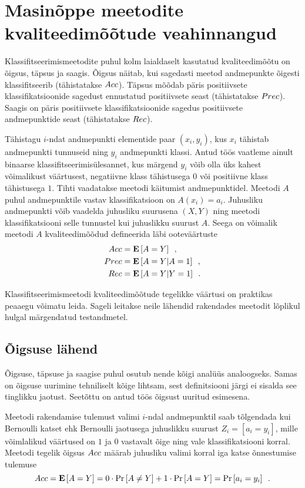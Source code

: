 \section{Masinõppe meetodite kvaliteedimõõtude veahinnangud}
\label{section:kvaliteedimõõtude veahinnangud}
Klassifitseerimismeetodite puhul kolm laialdaselt kasutatud kvaliteedimõõtu on õigsus, täpsus ja saagis. Õigsus näitab, kui sagedasti meetod andmepunkte õigesti klassifitseerib (tähistatakse $Acc$). Täpsus mõõdab päris positiivsete klassifikatsioonide sagedust ennustatud positiivsete seast (tähistatakse $Prec$). Saagis on päris positiivsete klassifikatsioonide sagedus positiivsete andmepunktide seast (tähistatakse $Rec$).

Tähistagu $i$-ndat andmepunkti elementide paar $(x_i, y_i)$, kus $x_i$ tähistab andmepunkti tunnuseid ning $y_i$ andmepunkti klassi. Antud töös vaatleme ainult binaarse klassifitseerimisülesannet, kus märgend $y_i$ võib olla üks kahest võimalikust väärtusest, negatiivne klass tähistusega $0$ või positiivne klass tähistusega $1$. Tihti vaadatakse meetodi käitumist andmepunktidel. Meetodi $A$ puhul andmepunktile vastav klassifikatsioon on $A(x_i)=a_i$. Juhusliku andmepunkti võib vaadelda juhusliku suurusena $(X, Y)$ ning meetodi klassifikatsiooni selle tunnustel  kui juhuslikku suurust $A$. Seega on võimalik meetodi $A$ kvaliteedimõõdud defineerida läbi ooteväärtuste
\begin{align}
    Acc&=\operatorname*{\mathbf{E}}\left[A=Y\right] \enspace, \label{eq:õigsus}\\
    Prec&=\operatorname*{\mathbf{E}}\left[A=Y|A=1\right] \enspace, \label{eq:täpsus}\\
    Rec&=\operatorname*{\mathbf{E}}\left[A=Y|Y=1\right] \enspace. \label{eq:saagis}
\end{align}

Klassifitseerimismeetodi kvaliteedimõõtude tegelikke väärtusi on praktikas peaaegu võimatu leida. Sageli leitakse neile lähendid rakendades meetodit lõplikul hulgal märgendatud testandmetel.

\subsection{Õigsuse lähend}
Õigsuse, täpsuse ja saagise puhul osutub nende kõigi analüüs analoogseks. Samas on õigsuse uurimine tehniliselt kõige lihtsam, sest definitsiooni järgi ei sisalda see tinglikku jaotust. Seetõttu on antud töös õigsust uuritud esimesena.
 
Meetodi rakendamise tulemust valimi $i$-ndal andmepunktil saab tõlgendada kui Bernoulli katset ehk Bernoulli jaotusega juhuslikku suurust $Z_i=[a_i=y_i]$, mille võimlalikud väärtused on $1$ ja $0$ vastavalt õige ning vale klassifikatsiooni korral. Meetodi tegelik õigsus $Acc$ määrab juhusliku valimi korral iga katse õnnestumise tulemuse
\begin{equation*}
    Acc=\operatorname*{\mathbf{E}}\left[A=Y\right]=0\cdot\Pr\left[A\neq Y\right]+1\cdot\Pr\left[A=Y\right]=\Pr\left[a_i=y_i\right] \enspace.
\end{equation*}

